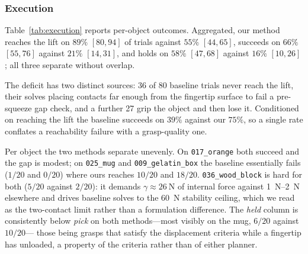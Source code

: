 \subsubsection{Execution}

Table~\ref{tab:execution} reports per-object outcomes. Aggregated, our method
reaches the lift on $89\%$ $[80,94]$ of trials against $55\%$ $[44,65]$, succeeds on
$66\%$ $[55,76]$ against $21\%$ $[14,31]$, and holds on $58\%$ $[47,68]$ against
$16\%$ $[10,26]$; all three separate without overlap.

The deficit has two distinct sources: 36 of 80 baseline trials never reach the lift,
their solves placing contacts far enough from the fingertip surface to fail a
pre-squeeze gap check, and a further 27 grip the object and then lose it.
Conditioned on reaching the lift the baseline succeeds on $39\%$ against our $75\%$,
so a single rate conflates a reachability failure with a grasp-quality one.

Per object the two methods separate unevenly. On \texttt{017\_orange} both succeed
and the gap is modest; on \texttt{025\_mug} and \texttt{009\_gelatin\_box} the
baseline essentially fails ($1/20$ and $0/20$) where ours reaches $10/20$ and
$18/20$. \texttt{036\_wood\_block} is hard for both ($5/20$ against $2/20$): it
demands $\gamma \approx \SI{26}{\newton}$ of internal force against
\SIrange{1}{2}{\newton} elsewhere and drives baseline solves to the
\SI{60}{\newton} stability ceiling, which we read as the two-contact limit rather
than a formulation difference. The \emph{held} column is consistently below
\emph{pick} on both methods---most visibly on the mug, $6/20$ against $10/20$---
those being grasps that satisfy the displacement criteria while a fingertip has
unloaded, a property of the criteria rather than of either planner.

